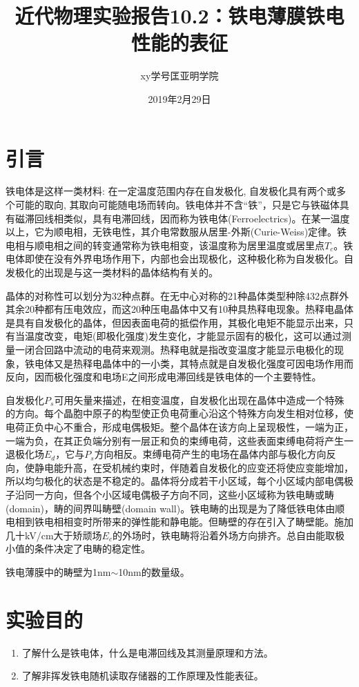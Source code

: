 \documentclass[a4paper]{article}
\title{近代物理实验报告10.2：铁电薄膜铁电性能的表征}
\author{xy\quad 学号\quad 匡亚明学院}
\date{2019年2月29日}
\begin{document}
\maketitle


\section{引言}
铁电体是这样一类材料: 在一定温度范围内存在自发极化, 自发极化具有两个或多个可能的取向, 其取向可能随电场而转向。铁电体并不含“铁”，只是它与铁磁体具有磁滞回线相类似，具有电滞回线，因而称为铁电体(Ferroelectrics)。在某一温度以上，它为顺电相，无铁电性，其介电常数服从居里-外斯(Curie-Weiss)定律。铁电相与顺电相之间的转变通常称为铁电相变，该温度称为居里温度或居里点$T_c$。铁电体即使在没有外界电场作用下，内部也会出现极化，这种极化称为自发极化。自发极化的出现是与这一类材料的晶体结构有关的。

晶体的对称性可以划分为32种点群。在无中心对称的21种晶体类型种除432点群外其余20种都有压电效应，而这20种压电晶体中又有10种具热释电现象。热释电晶体是具有自发极化的晶体，但因表面电荷的抵偿作用，其极化电矩不能显示出来，只有当温度改变，电矩(即极化强度)发生变化，才能显示固有的极化，这可以通过测量一闭合回路中流动的电荷来观测。热释电就是指改变温度才能显示电极化的现象，铁电体又是热释电晶体中的一小类，其特点就是自发极化强度可因电场作用而反向，因而极化强度和电场E之间形成电滞回线是铁电体的一个主要特性。

自发极化$P_s$可用矢量来描述，在相变温度，自发极化出现在晶体中造成一个特殊的方向。每个晶胞中原子的构型使正负电荷重心沿这个特殊方向发生相对位移，使电荷正负中心不重合，形成电偶极矩。整个晶体在该方向上呈现极性，一端为正，一端为负，在其正负端分别有一层正和负的束缚电荷，这些表面束缚电荷将产生一退极化场$E_d$，它与$P_s$方向相反。束缚电荷产生的电场在晶体内部与极化方向反向，使静电能升高，在受机械约束时，伴随着自发极化的应变还将使应变能增加，所以均匀极化的状态是不稳定的。晶体将分成若干小区域，每个小区域内部电偶极子沿同一方向，但各个小区域电偶极子方向不同，这些小区域称为铁电畴或畴(domain)，畴的间界叫畴壁(domain wall)。铁电畴的出现是为了降低铁电体由顺电相到铁电相相变时所带来的弹性能和静电能。但畴壁的存在引入了畴壁能。施加几十kV/cm大于矫顽场$E_c$的外场时，铁电畴将沿着外场方向排齐。总自由能取极小值的条件决定了电畴的稳定性。

铁电薄膜中的畴壁为1nm$\sim$10nm的数量级。

\section{实验目的}
\begin{enumerate}
    \item 了解什么是铁电体，什么是电滞回线及其测量原理和方法。
    \item 了解非挥发铁电随机读取存储器的工作原理及性能表征。
\end{enumerate}
\end{document}
